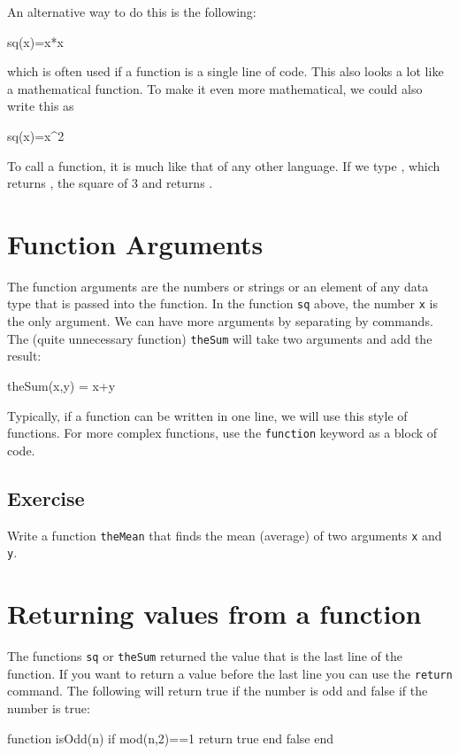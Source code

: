 An alternative way to do this is the following:
%
\begin{jlblock}[functions]
sq(x)=x*x
\end{jlblock}
which is often used if a function is a single line of code.  This also looks a lot like a mathematical function. To make it even more mathematical, we could also write this as
\begin{jlblock}[functions]
sq(x)=x^2
\end{jlblock}


To call a function, it is much like that of any other language. If we
type , which returns \printpythontex[verb], the square of 3 and  returns \printpythontex[verb].


\section{Function Arguments}

The function arguments are the numbers or strings or an element of any data type that is passed into the function. In the function \texttt{sq} above, the number \texttt{x} is the only argument. We can have more arguments by separating by commands. The (quite unnecessary function) \texttt{theSum} will take two arguments and add the result:
%
\begin{jlblock}[functions]
theSum(x,y) = x+y
\end{jlblock}
%
Typically, if a function can be written in one line, we will use this style of functions.  For more complex functions, use the \texttt{function} keyword as a block of code. 

\subsection{Exercise}

Write a function \texttt{theMean} that finds the mean (average) of two arguments \texttt{x} and \texttt{y}.

\section{Returning values from a function}

The functions \texttt{sq} or \texttt{theSum} returned the value that is the last line of the function. If you want to return a value before the last line you can use the \texttt{return} command. The following will return true if the number is odd and false if the number is true:
%
\begin{jlblock}[functions][numbers=left]
function isOdd(n)
  if mod(n,2)==1
    return true
  end
  false
end
\end{jlblock}

